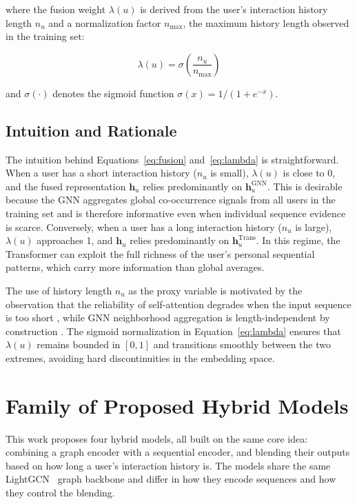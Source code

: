 \documentclass[12pt,a4paper]{report}
\begin{document}
\noindent where the fusion weight \(\lambda(u)\) is derived from the user's
interaction history length \(n_u\) and a normalization factor \(n_{\max}\),
the maximum history length observed in the training set:

\begin{equation}
    \lambda(u) = \sigma\!\left(\frac{n_u}{n_{\max}}\right)
    \label{eq:lambda}
\end{equation}

\noindent and \(\sigma(\cdot)\) denotes the sigmoid function
\(\sigma(x) = 1/(1 + e^{-x})\).

\subsection{Intuition and Rationale}

\justifying
The intuition behind Equations~\ref{eq:fusion} and~\ref{eq:lambda} is
straightforward. When a user has a short interaction history (\(n_u\) is
small), \(\lambda(u)\) is close to 0, and the fused representation
\(\mathbf{h}_u\) relies predominantly on \(\mathbf{h}_u^{\text{GNN}}\). This
is desirable because the GNN aggregates global co-occurrence signals from all
users in the training set and is therefore informative even when individual
sequence evidence is scarce. Conversely, when a user has a long interaction
history (\(n_u\) is large), \(\lambda(u)\) approaches 1, and \(\mathbf{h}_u\)
relies predominantly on \(\mathbf{h}_u^{\text{Trans}}\). In this regime, the
Transformer can exploit the full richness of the user's personal sequential
patterns, which carry more information than global averages.

The use of history length \(n_u\) as the proxy variable is motivated by the
observation that the reliability of self-attention degrades when the input
sequence is too short \citep{kang2018sasrec, sun2019bert4rec}, while GNN
neighborhood aggregation is length-independent by construction
\citep{he2020lightgcn}. The sigmoid normalization in
Equation~\ref{eq:lambda} ensures that \(\lambda(u)\) remains bounded in
\([0, 1]\) and transitions smoothly between the two extremes, avoiding hard
discontinuities in the embedding space.


\section{Family of Proposed Hybrid Models}
\label{sec:family}
\justifying

This work proposes four hybrid models, all built on the same core idea:
combining a graph encoder with a sequential encoder, and blending their
outputs based on how long a user's interaction history is. The models share
the same LightGCN~\citep{he2020lightgcn} graph backbone and differ in how
they encode sequences and how they control the blending.
\end{document}
